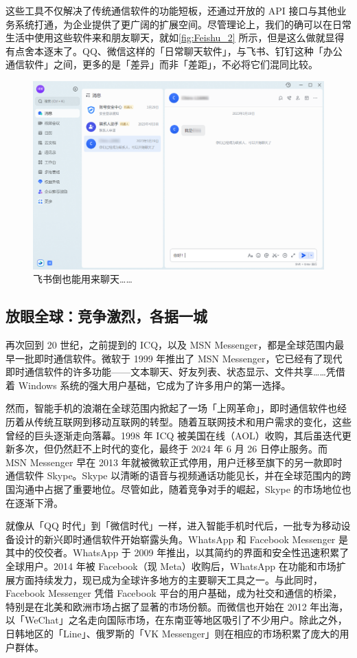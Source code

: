 这些工具不仅解决了传统通信软件的功能短板，还通过开放的 API 接口与其他业务系统打通，为企业提供了更广阔的扩展空间。尽管理论上，我们的确可以在日常生活中使用这些软件来和朋友聊天，就如\autoref{fig:Feishu_2} 所示，但是这么做就显得有点舍本逐末了。QQ、微信这样的「日常聊天软件」，与飞书、钉钉这种「办公通信软件」之间，更多的是「差异」而非「差距」，不必将它们混同比较。

\begin{figure}[htb!]
  \centering
  \includegraphics[width=.7\textwidth]{assets/software/Feishu_1.png}
  \caption{飞书倒也能用来聊天……}
  \label{fig:Feishu_2}
\end{figure}

\subsection{放眼全球：竞争激烈，各据一城}

再次回到 20 世纪，之前提到的 ICQ，以及 MSN Messenger，都是全球范围内最早一批即时通信软件。微软于 1999 年推出了 MSN Messenger，它已经有了现代即时通信软件的许多功能——文本聊天、好友列表、状态显示、文件共享……凭借着 Windows 系统的强大用户基础，它成为了许多用户的第一选择。

然而，智能手机的浪潮在全球范围内掀起了一场「上网革命」，即时通信软件也经历着从传统互联网到移动互联网的转型。随着互联网技术和用户需求的变化，这些曾经的巨头逐渐走向落幕。1998 年 ICQ 被美国在线（AOL）收购，其后虽迭代更新多次，但仍然赶不上时代的变化，最终于 2024 年 6 月 26 日停止服务。而 MSN Messenger 早在 2013 年就被微软正式停用，用户迁移至旗下的另一款即时通信软件 Skype。Skype 以清晰的语音与视频通话功能见长，并在全球范围内的跨国沟通中占据了重要地位。尽管如此，随着竞争对手的崛起，Skype 的市场地位也在逐渐下滑。

就像从「QQ 时代」到「微信时代」一样，进入智能手机时代后，一批专为移动设备设计的新兴即时通信软件开始崭露头角。WhatsApp 和 Facebook Messenger 是其中的佼佼者。WhatsApp 于 2009 年推出，以其简约的界面和安全性迅速积累了全球用户。2014 年被 Facebook（现 Meta）收购后，WhatsApp 在功能和市场扩展方面持续发力，现已成为全球许多地方的主要聊天工具之一。与此同时，Facebook Messenger 凭借 Facebook 平台的用户基础，成为社交和通信的桥梁，特别是在北美和欧洲市场占据了显著的市场份额。而微信也开始在 2012 年出海，以「WeChat」之名走向国际市场，在东南亚等地区吸引了不少用户。除此之外，日韩地区的「Line」、俄罗斯的「VK Messenger」则在相应的市场积累了庞大的用户群体。

